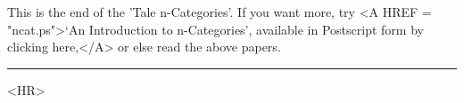 This is the end of the 'Tale n-Categories'.  If you want more, try
<A HREF = "ncat.ps">`An Introduction to n-Categories', available in 
Postscript form by clicking here,</A> or else read the above
papers. 


\par\noindent\rule{\textwidth}{0.4pt}

<HR>



